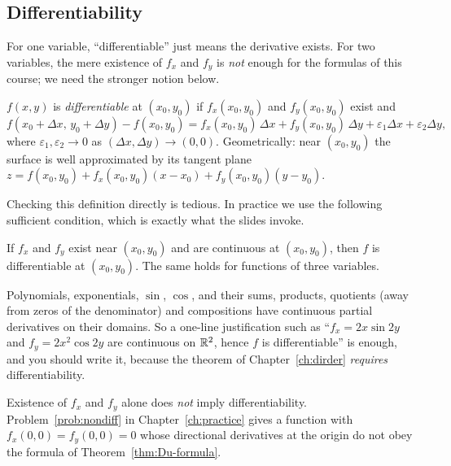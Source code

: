 \subsection{Differentiability}

For one variable, ``differentiable'' just means the derivative exists. For two
variables, the mere existence of $f_x$ and $f_y$ is \emph{not} enough for the
formulas of this course; we need the stronger notion below.

\begin{definition}
$f(x,y)$ is \emph{differentiable} at $(x_0,y_0)$ if $f_x(x_0,y_0)$ and
$f_y(x_0,y_0)$ exist and
\[
  f(x_0+\Delta x,\,y_0+\Delta y)-f(x_0,y_0)
  = f_x(x_0,y_0)\,\Delta x+f_y(x_0,y_0)\,\Delta y+\varepsilon_1\Delta x+\varepsilon_2\Delta y,
\]
where $\varepsilon_1,\varepsilon_2\to0$ as $(\Delta x,\Delta y)\to(0,0)$.
Geometrically: near $(x_0,y_0)$ the surface is well approximated by its
tangent plane $z=f(x_0,y_0)+f_x(x_0,y_0)(x-x_0)+f_y(x_0,y_0)(y-y_0)$.
\end{definition}

Checking this definition directly is tedious. In practice we use the following
sufficient condition, which is exactly what the slides invoke.

\begin{theorem}\label{thm:C1}
If $f_x$ and $f_y$ exist near $(x_0,y_0)$ and are continuous at $(x_0,y_0)$,
then $f$ is differentiable at $(x_0,y_0)$. The same holds for functions of
three variables.
\end{theorem}

\begin{remark}
Polynomials, exponentials, $\sin$, $\cos$, and their sums, products, quotients
(away from zeros of the denominator) and compositions have continuous partial
derivatives on their domains. So a one-line justification such as
``$f_x=2x\sin2y$ and $f_y=2x^2\cos2y$ are continuous on $\mathbb{R}^2$, hence $f$ is
differentiable'' is enough, and you should write it, because the theorem of
Chapter~\ref{ch:dirder} \emph{requires} differentiability.
\end{remark}

\begin{warning}
Existence of $f_x$ and $f_y$ alone does \emph{not} imply differentiability.
Problem~\ref{prob:nondiff} in Chapter~\ref{ch:practice} gives a function with
$f_x(0,0)=f_y(0,0)=0$ whose directional derivatives at the origin do not obey
the formula of Theorem~\ref{thm:Du-formula}.
\end{warning}

